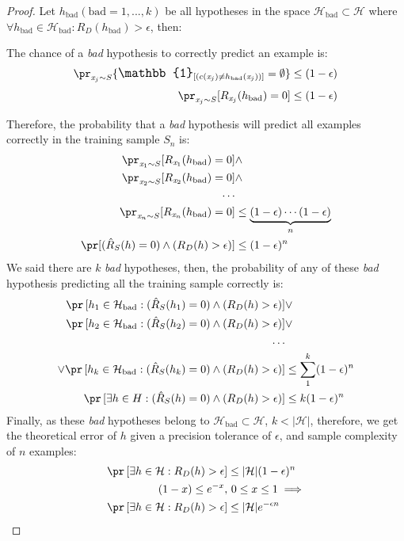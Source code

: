 \documentclass[
  letterpaper,
  12pt,
  british]{tufte-book}
\theoremstyle{plain}
\theoremstyle{definition}
\theoremstyle{plain}
\theoremstyle{remark}
\begin{document}
\begin{proof}

Let \(h_{\text{bad}} (\text{bad} = 1, ..., k)\) be all hypotheses in the
space \(\mathcal{H}_{\text{bad}} \subset \mathcal{H}\) where
\(\forall h_{\text{bad}} \in \mathcal{H}_{\text{bad}}: R_{D}(h_{\text{bad}})>\epsilon\),
then:

The chance of a \emph{bad} hypothesis to correctly predict an example
is: \begin{align}
        \pr_{\mathit{x}_j\sim S}\{{\Large\mathbb{1}}_{[(c(\mathit{x}_j) \neq h_{\text{bad}}(\mathit{x}_j))]}=\emptyset\} \leq (1-\epsilon) \\
        \pr_{\mathit{x}_j\sim S}[R_{\mathit{x}_j}(h_{\text{bad}})=0] \leq (1-\epsilon)
    \label{haussler:a} 
\end{align}

Therefore, the probability that a \emph{bad} hypothesis will predict all
examples correctly in the training sample \(S_n\) is: \begin{align}
        \pr_{\mathit{x}_1 \sim S}[R_{\mathit{x}_1}(h_{\text{bad}})=0] &\land\\
        \pr_{\mathit{x}_2 \sim S}[R_{\mathit{x}_2}(h_{\text{bad}})=0] &\land\\
        \nonumber \cdots\\
        \pr_{\mathit{x}_n \sim S}[R_{\mathit{x}_n}(h_{\text{bad}})=0] &\leq \underbrace{(1-\epsilon) \cdots (1-\epsilon)}_{n} \\
        \pr[(\hat{R}_{S}(h)=0) \land (R_{D}(h)> \epsilon)] &\leq (1-\epsilon)^n
    \label{haussler:b} 
\end{align} We said there are \(k\) \emph{bad} hypotheses, then, the
probability of any of these \emph{bad} hypothesis predicting all the
training sample correctly is: \begin{align}
        \pr\,[h_1 \in \mathcal{H}_{\text{bad}}: (\hat{R}_{S}(h_1)=0) \land (R_{D}(h)> \epsilon)] &\lor \\
        \pr\,[h_2 \in \mathcal{H}_{\text{bad}}: (\hat{R}_{S}(h_2)=0) \land (R_{D}(h)> \epsilon)] &\lor \\
        \ldots \nonumber \\
        \lor \pr\,[h_k \in \mathcal{H}_{\text{bad}}: (\hat{R}_{S}(h_k)=0) \land (R_{D}(h)> \epsilon)] &
        \leq \sum_{1}^k (1-\epsilon)^n\\
        \pr\,[\exists h \in H: (\hat{R}_{S}(h)=0) \land (R_{D}(h)>\epsilon)] &\leq k (1-\epsilon)^n
    \label{haussler:c} 
\end{align} Finally, as these \emph{bad} hypotheses belong to
\(\mathcal{H}_{\text{bad}} \subset \mathcal{H}\), \(k < |\mathcal{H}|\),
therefore, we get the theoretical error of \(h\) given a precision
tolerance of \(\epsilon\), and sample complexity of \(n\) examples:
\begin{align}
        \pr\,[\exists h \in \mathcal{H}: R_{D}(h)>\epsilon]&\leq |\mathcal{H}| (1-\epsilon)^n\label{haussler:d}\\
        (1-x) \leq e^{-x},&~0 \leq x \leq 1 \implies \nonumber\\
        \pr\,[\exists h \in \mathcal{H}: R_{D}(h)>\epsilon]&\leq |\mathcal{H}|e^{-\epsilon n} \nonumber
    

\end{align}
\end{proof}
\end{document}
